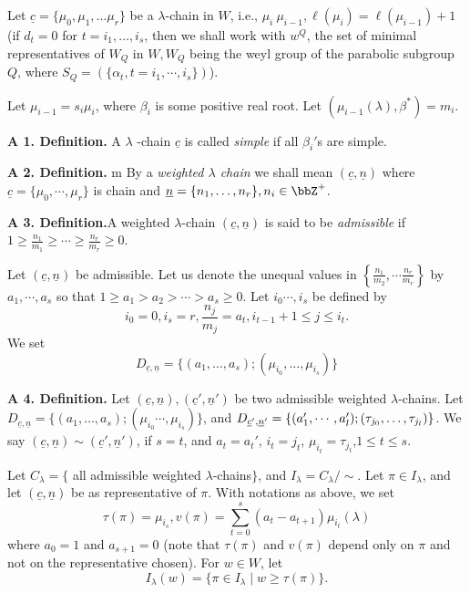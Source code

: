 Let $\underline{c}= \{ \mu_{0}, \mu_{1}, \ldots \mu_{r}\}$ be a $\lambda$-chain in $W$, i.e., $\mu_{i} \> \mu_{i-1}, \ell(\mu_{i}) = \ell(\mu_{i-1})+1$ (if $d_{t}=0$ for $t = i_{1}, \ldots, i_{s}$, then we shall work with $w^{Q}$, the set of minimal representatives of $W_{Q}$ in $W, W_{Q}$ being the weyl group of the parabolic subgroup $Q$, where $S_{Q}=(\{\alpha_{t}, t= i_{1}, \cdots, i_{s}\})$). 

Let $\mu_{i-1}= s_{i}\mu_{i}$, where $\beta_{i}$ is some positive real root. Let $(\mu_{i-1}(\lambda), \beta^{*}) = m_{i}$.

\noindent
{\bfseries A 1. Definition.}\label{A. 1. definition.} A $\lambda$ -chain $\underline{c}$ is called \textit{simple} if all $\beta_{i}'$s are simple. 

\medskip
\noindent
{\bfseries A 2. Definition.}\label{A. 2. definition.} m By a \textit{weighted $\lambda$ chain} we shall mean $(\underline{c}, \underline{n})$ where $\underline{c}= \{ \mu_{0}, \cdots, \mu_{r}\}$ is chain and $\underline{n} =\{n_{1}, \ldots, n_{r}\}, n_{i} \in \bbZ^{+}$.

\medskip
\noindent
{\bfseries A 3. Definition.}\label{A. 3. definition.}A weighted $\lambda$-chain $(\underline{c}, \underline{n})$ is said to be \textit{admissible} if $1 \geq \frac{n_{1}}{m_{1}}\geq \cdots \geq \frac{n_{r}}{m_{r}} \geq 0$.

Let $(\underline{c}, \underline{n})$ be admissible. Let us denote the unequal values in $\left\{\frac{n_{1}}{m_{2}}, \cdots \frac{n_{r}}{m_{r}}\right\}$ by $a_{1}, \cdots, a_{s}$ so that $1 \geq a_{1}> a_{2} > \cdots > a_{s} \geq 0$. Let $i_{0}\cdots, i_{s}$ be defined by
$$
i_{0}=0, i_{s}=r, \frac{n_{j}}{m_{j}} = a_{t}, i_{t-1}+1 \leq j \leq i_{t}.
$$
We set
$$
D_{\underline{c}, \underline{n}} = \{(a_{1}, \ldots, a_{s});(\mu_{i_{0}},\ldots,\mu_{i_{s}})\}
$$

\medskip
\noindent
{\bfseries A 4. Definition.}\label{A. 4. definition.} Let $(\underline{c}, \underline{n}), (\underline{c}', \underline{n}')$ be two admissible weighted $\lambda$-chains. Let $D_{\underline{c}, \underline{n}} =\{(a_{1}, \ldots, a_{s});(\mu_{i_{0}}\cdots,\mu_{i_{s}})\}$, and $ D_{\underline{c}', \underline{n}'} = \{(a_{1}', \cdots, a_{l}');\break (\tau_{j_{0}}, \ldots, \tau_{j_{l}})\}$. We say $(\underline{c}, \underline{n}) \sim (\underline{c}',\underline{n}')$, if $s =t$, and $a_{t}=a_{t}'$, $i_{t}=j_{t}$, $\mu_{i_{t}} = \tau_{j_{t}}$,$1 \leq t \leq s$.

Let $C_{\lambda}=\{$ all admissible weighted $\lambda$-chains$\}$, and $I_{\lambda} = C_{\lambda}/ \sim$. Let $ \pi \in I_{\lambda}$, and let $(\underline{c}, \underline{n})$ be as representative of $\pi$. With notations as above, we set
$$
\tau(\pi)= \mu_{i_{s}}, v(\pi) = \sum\limits_{t=0}^{s}(a_{t}-a_{t+1})\mu_{i_{t}}(\lambda)
$$
where $a_{0}=1$ and $ a_{s+1}=0$ (note that $\tau(\pi)$ and $ v(\pi)$ depend only on $\pi$ and not on the representative chosen). For $w \in W$, let
$$
I_{\lambda}(w) =\{\pi \in I_{\lambda} \;| \;w \geq \tau(\pi)\}.
$$

